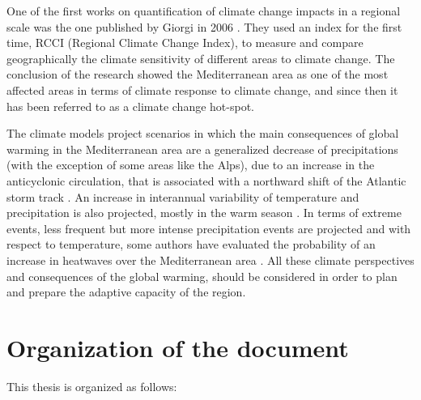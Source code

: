 One of the first works on quantification of climate change impacts in a regional scale was the one published by Giorgi in 2006 \cite*{Giorgi2006}. They used an index for the first time, RCCI (Regional Climate Change Index), to measure and compare geographically the climate sensitivity of different areas to climate change. The conclusion of the research showed the Mediterranean area as one of the most affected areas in terms of climate response to climate change, and since then it has been referred to as a climate change hot-spot.


The climate models project scenarios in which the main consequences of global warming in the Mediterranean area are a generalized decrease of precipitations (with the exception of some areas like the Alps), due to an increase in the anticyclonic circulation, that is associated with a northward shift of the Atlantic storm track \cite*{Yin2005}. An increase in interannual variability of temperature and precipitation is also projected, mostly in the warm season \cite*{Giorgi2008}. In terms of extreme events, less frequent but more intense precipitation events are projected \cite*{Drobinski} and with respect to temperature, some authors have evaluated the probability of an increase in heatwaves over the Mediterranean area \cite*{meehl2004, Fischer2010}. All these climate perspectives and consequences of the global warming,  should be considered in order to plan and prepare the adaptive capacity of the region.\\   

\section{Organization of the document}%

This thesis is organized as follows:

